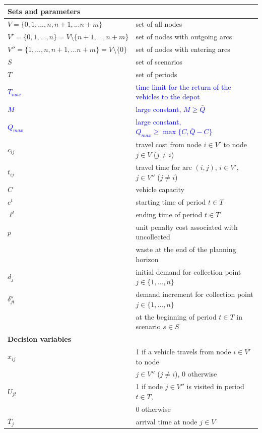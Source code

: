 \documentclass[authoryear,preprint,12pt]{elsarticle}
\newcommand{\rev}[1]{\textcolor{blue}{{#1}}}
\begin{document}
\begin{table}[h!]
		\centering
		\begin{tabular}{ll}			
\hline
\textbf{Sets and parameters}\\
\hline\vspace{1mm}
			$V=\{0,1,...,n,n+1,...n+m\}$ & set of all nodes\\
			$V'=\{0,1,...,n\}=V\setminus\{n+1,...,n+m\}$  & set of nodes with outgoing arcs\\
			$V''=\{1,...,n,n+1,...n+m\}=V\setminus\{0\}$ & set of nodes with entering arcs\\
			$S$ & set of scenarios \\
            $T$ & set of periods \\
            \rev{$T_{max}$} & \rev{time limit for the return of the vehicles to the depot}\\
            \rev{$M$} & \rev{large constant, $M\ge\bar Q$}\\ 
            \rev{$Q_{max}$} & \rev{large constant, $Q_{max}\ge\max\{C,\bar Q-C\}$}\\
            $c_{ij}$ & travel cost from node $i \in V'$ to node $j \in V$ ($j\neq i$)\\
            $t_{ij}$ & travel time for arc $(i,j)$, $i\in V'$, $j\in V''$ ($j \neq i$)\\
			$C$ & vehicle capacity\\
			$e^t$ & starting time of period $t\in T$\\
            $\ell^t$ & ending time of period $t\in T$\\
            $p$ & unit penalty cost associated with uncollected\\ & waste at the end of the planning horizon\\
$d_j$ & initial demand for collection point $j\in\{1,...,n\}$\\
$\delta_{jt}^s$ & demand increment for collection point $j\in\{1,...,n\}$  \\ & at the beginning of period $t\in T$ in scenario $s \in S$\\
\hline
\textbf{Decision variables}\\
\hline
	$x_{ij}$ & 1 if a vehicle travels from node $i \in V'$ to node \\ & $j \in V''$ ($j\neq i$), $0$ otherwise\\
 $U_{jt}$ & 1 if node $j\in V''$ is visited in period $t \in T$,\\ & $0$ otherwise\\
 $\bar{T}_j$ & arrival time at node $j\in V$ \\

\end{tabular}
\end{table}
\end{document}
